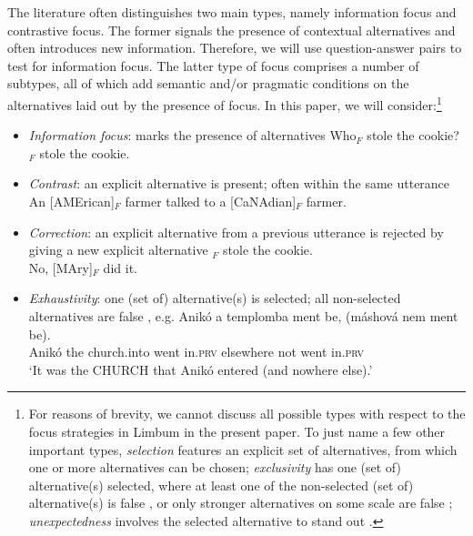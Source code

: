 \documentclass[output=paper,
modfonts
]{langscibook}
\begin{document}
The literature often distinguishes two main types, namely information focus and contrastive focus. The former signals the presence of contextual alternatives and often introduces new information. Therefore, we will use question-answer pairs to test for information focus. The latter type of focus comprises a number of subtypes, all of which add semantic and/or pragmatic conditions on the alternatives laid out by the presence of focus. In this paper, we will consider:\footnote{For reasons of brevity, we cannot discuss all possible types with respect to the focus strategies in Limbum in the present paper. To just name a few other important types, \textit{selection} features an explicit set of alternatives, from which one or more alternatives can be chosen; \textit{exclusivity} has one (set of) alternative(s) selected, where at least one of the non-selected (set of) alternative(s) is false \citep{vanderWal2011,vanderWal2014}, or only stronger alternatives on some scale are false \citep{BeaverClark2008,BeaverCoppock2012}; \textit{unexpectedness} involves the selected alternative to stand out \citep{Zimmermann2008,Zimmermann2011,Hartmann2008,SkopeteasFanselow2009,SkopeteasFanselow2011,Frey2010,ZimmermannOnea2011,DestruelVelleman2014}. }
\begin{itemize}
\item \textit{Information focus}: marks the presence of alternatives
\ea Who$_F$ stole the cookie?\\ \relax[PEter]$_F$ stole the cookie. \z
\item \textit{Contrast}: an explicit alternative is present; often within the same utterance
\ea An [AMErican]$_F$ farmer talked to a [CaNAdian]$_F$ farmer. \z
\item \textit{Correction}: an explicit alternative from a previous utterance is rejected by giving a new explicit alternative
\ea \relax[PEter]$_F$ stole the cookie.\\ No, [MAry]$_F$ did it.\z
\item \textit{Exhaustivity}: one (set of) alternative(s) is selected; all non-selected alternatives are false \citep{Szabolcsi1981,EKiss1998,VallduviVilkuna1998,Horvath2010,Horvath2013}, e.g.
\ea
\settowidth{}
\gll Anikó a templomba ment be, (máshová nem ment be).\\
Anikó the church.into went in.\textsc{prv} elsewhere not went in.\textsc{prv}\\ 
\glt `It was the CHURCH that Anikó entered (and nowhere else).'
\z 
\end{itemize}
\end{document}
